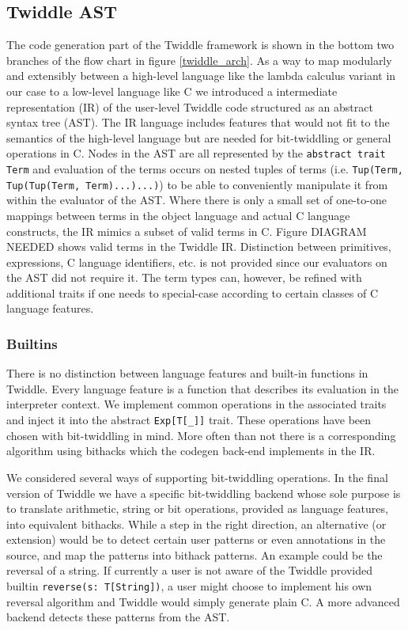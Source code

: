 \documentclass{article}
\begin{document}
\subsection{Twiddle AST}
The code generation part of the Twiddle framework is shown in the bottom two branches of the flow chart in figure \ref{twiddle_arch}. As a way to map modularly and extensibly between a high-level language like the lambda calculus variant in our case to a low-level language like C we introduced a intermediate representation (IR) of the user-level Twiddle code structured as an abstract syntax tree (AST). The IR language includes features that would not fit to the semantics of the high-level language but are needed for bit-twiddling or general operations in C. Nodes in the AST are all represented by the \texttt{abstract trait Term} and evaluation of the terms occurs on nested tuples of terms (i.e. \texttt{Tup(Term, Tup(Tup(Term, Term)...)...)}) to be able to conveniently manipulate it from within the evaluator of the AST. Where there is only a small set of one-to-one mappings between terms in the object language and actual C language constructs, the IR mimics a subset of valid terms in C. Figure DIAGRAM NEEDED shows valid terms in the Twiddle IR. Distinction between primitives, expressions, C language identifiers, etc. is not provided since our evaluators on the AST did not require it. The term types can, however, be refined with additional traits if one needs to special-case according to certain classes of C language features.

\subsubsection{Builtins}
There is no distinction between language features and built-in functions in Twiddle. Every language feature is a function that describes its evaluation in the interpreter context. We implement common operations in the associated traits and inject it into the abstract \texttt{Exp[T[\_]]} trait. These operations have been chosen with bit-twiddling in mind. More often than not there is a corresponding algorithm using bithacks \cite{anderson2005bit} which the codegen back-end implements in the IR.

We considered several ways of supporting bit-twiddling operations. In the final version of Twiddle we have a specific bit-twiddling backend whose sole purpose is to translate arithmetic, string or bit operations, provided as language features, into equivalent bithacks. While a step in the right direction, an alternative (or extension) would be to detect certain user patterns or even annotations in the source, and map the patterns into bithack patterns. An example could be the reversal of a string. If currently a user is not aware of the Twiddle provided builtin \texttt{reverse(s: T[String])}, a user might choose to implement his own reversal algorithm and Twiddle would simply generate plain C. A more advanced backend detects these patterns from the AST.
\end{document}
